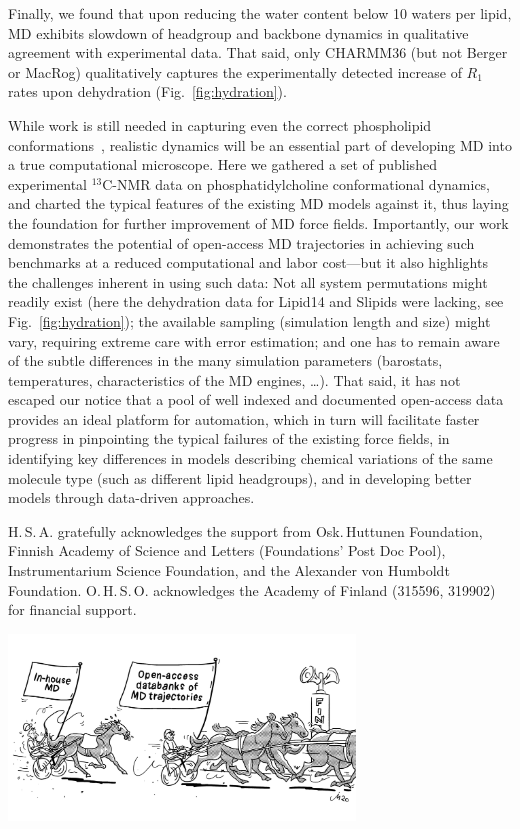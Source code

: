 \documentclass[journal=jcisd8,manuscript=article,layout=twocolumn]{achemso}
\begin{document}
Finally, we found that
upon reducing the water content below 10 waters per lipid, MD exhibits slowdown of headgroup and backbone dynamics  in qualitative agreement with experimental data. That said, only CHARMM36
(but not Berger or MacRog)
qualitatively captures the experimentally detected increase of $R_1$ rates upon dehydration (Fig.~\ref{fig:hydration}).

While work is still needed in capturing even the correct phospholipid conformations~\cite{botan15}, realistic dynamics will be an essential part of developing MD into a true computational microscope.
Here we gathered a set of published experimental $^{13}$C-NMR data on phosphatidylcholine conformational dynamics, and charted the typical features of the existing MD models against it, thus laying the foundation for further improvement of MD force fields. 
%
Importantly, our work demonstrates the potential of open-access MD trajectories in achieving such benchmarks at a reduced computational and labor cost---but
%
it also highlights the challenges inherent in using such data:
Not all system permutations might readily exist (here the dehydration data for Lipid14 and Slipids were lacking, see Fig.~\ref{fig:hydration});
the available sampling (simulation length and size) might vary, requiring extreme care with error estimation; and one has to remain aware of the subtle differences in the many simulation parameters (barostats, temperatures, characteristics of the MD engines, \ldots).
%
That said, it has not escaped our notice that
a pool of well indexed and documented open-access data provides an ideal platform for automation, which in turn will facilitate faster progress
in pinpointing the typical failures of the existing force fields,
in identifying key differences in models describing chemical variations of the same molecule type (such as different lipid headgroups), and
in developing better models through data-driven approaches.


\acknowledgement
H.\,S.\,A. gratefully acknowledges the support from Osk.\,Huttunen Foundation, Finnish Academy of Science and Letters (Foundations’ Post Doc Pool), Instrumentarium Science Foundation, and the Alexander von Humboldt Foundation.
O.\,H.\,S.\,O. acknowledges the Academy of Finland (315596, 319902) for financial support.


\begin{tocentry}
  \vspace{-9mm}
  \hspace{-2mm}
  \includegraphics[width=92mm]{../Figs/TOC_inPNGforLatex.png}
\end{tocentry}
\end{document}
